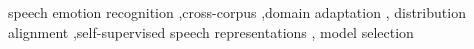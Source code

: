 \documentclass[a4paper,fleqn]{cas-dc}
\begin{document}
\begin{keywords}
speech emotion recognition \sep cross-corpus \sep domain adaptation \sep
distribution alignment \sep self-supervised speech representations \sep
model selection
\end{keywords}

\maketitle
\linenumbers












\end{document}
